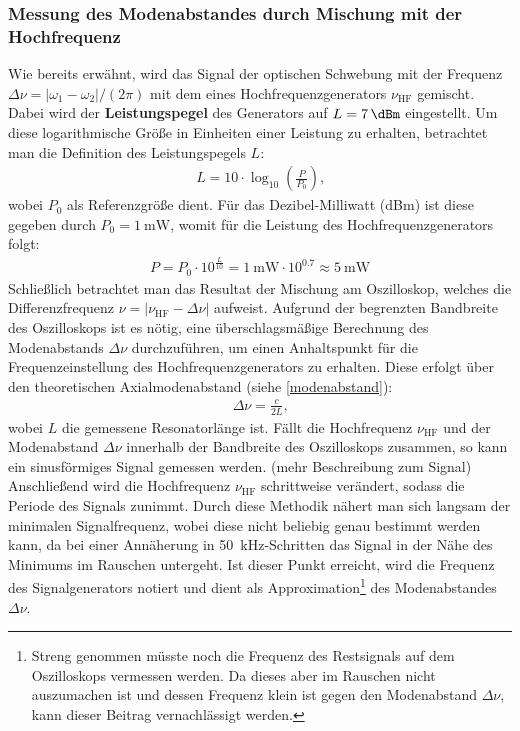\documentclass[11pt, a4paper]{article}
\numberwithin{equation}{section}
\begin{document}
\subsubsection{Messung des Modenabstandes durch Mischung mit der Hochfrequenz}
Wie bereits erwähnt, wird das Signal der optischen Schwebung mit der Frequenz $\Delta \nu = |\omega_1 - \omega_2| / (2\pi)$ mit dem eines Hochfrequenzgenerators $\nu_\mathrm{HF}$ gemischt.
Dabei wird der \textbf{Leistungspegel} des Generators auf $L = \SI{+7}{\dBm}$ eingestellt. Um diese logarithmische Größe in Einheiten einer Leistung zu erhalten, betrachtet man die Definition des Leistungspegels $L$: 
\begin{align}
	L = 10 \cdot \log_{10}\left( \frac{P}{P_0}\right) \text{,}
\end{align}
wobei $P_0$ als Referenzgröße dient.
Für das Dezibel-Milliwatt (\si{dBm}) ist diese gegeben durch $P_0 = \SI{1}{\milli\watt}$, womit für die Leistung des Hochfrequenzgenerators folgt:
\begin{align}
	P = P_0 \cdot 10^{\frac{L}{10}} = \SI{1}{\milli\watt} \cdot 10^{\num{0.7}} \approx \SI{5}{\milli\watt}
\end{align}
Schließlich betrachtet man das Resultat der Mischung am Oszilloskop, welches die Differenzfrequenz $\nu = |\nu_\mathrm{HF} - \Delta \nu|$ aufweist.
Aufgrund der begrenzten Bandbreite des Oszilloskops ist es nötig, eine überschlagsmäßige Berechnung des Modenabstands $\Delta \nu$ durchzuführen, um einen Anhaltspunkt für die Frequenzeinstellung des Hochfrequenzgenerators zu erhalten.
Diese erfolgt über den theoretischen Axialmodenabstand (siehe \eqref{modenabstand}):
\begin{align}
	\Delta \nu = \frac{c}{2 L} \text{,}
\end{align}
wobei $L$ die gemessene Resonatorlänge ist.
Fällt die Hochfrequenz $\nu_\mathrm{HF}$ und der Modenabstand $\Delta \nu$ innerhalb der Bandbreite des Oszilloskops zusammen, so kann ein sinusförmiges Signal gemessen werden.
(mehr Beschreibung zum Signal)
Anschließend wird die Hochfrequenz $\nu_\mathrm{HF}$ schrittweise verändert, sodass die Periode des Signals zunimmt.
Durch diese Methodik nähert man sich langsam der minimalen Signalfrequenz, wobei diese nicht beliebig genau bestimmt werden kann, da bei einer Annäherung in \SI{50}{\kilo\hertz}-Schritten das Signal in der Nähe des Minimums im Rauschen untergeht.
Ist dieser Punkt erreicht, wird die Frequenz des Signalgenerators notiert und dient als Approximation\footnote{Streng genommen müsste noch die Frequenz des Restsignals auf dem Oszilloskops vermessen werden. Da dieses aber im Rauschen nicht auszumachen ist und dessen Frequenz klein ist gegen den Modenabstand $\Delta \nu$, kann dieser Beitrag vernachlässigt werden.} des Modenabstandes $\Delta \nu$.
\end{document}
